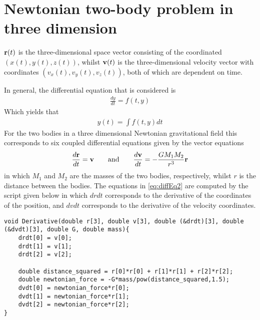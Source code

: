\section{Newtonian two-body problem in three dimension}
\label{Newton2body3D}
$\mbox{\textbf{r}}(t)$ is the three-dimensional space vector consisting of the coordinated $(x(t),y(t),z(t))$, whilst $\mbox{\textbf{v}}(t)$ is the three-dimensional velocity vector with coordinates $(v_x(t),v_y(t),v_z(t))$, both of which are dependent on time. 

In general, the differential equation that is considered is
\begin{align}
	\frac{dy}{dt} = f(t,y)
	\label{eq:diffEq1}
\end{align}
Which yields that
\begin{align}
	y(t) = \int f(t,y) dt
\end{align}
For the two bodies in a three dimensional Newtonian gravitational field this corresponds to six coupled differential equations given by the vector equations
\begin{align}
	\frac{d\mbox{\textbf{r}}}{dt} = \mbox{\textbf{v}}
	\qquad \text{and} \qquad
	\frac{d\mbox{\textbf{v}}}{dt} = - \frac{G M_1 M_2}{r^3} \mbox{\textbf{r}}
	\label{eq:diffEq2}
\end{align}
in which $M_1$ and $M_2$  are the masses of the two bodies, respectively, whilst $r$ is the distance between the bodies.
The equations in \eqref{eq:diffEq2} are computed by the script given below in which $drdt$ corresponds to the derivative of the coordinates of the position, and $dvdt$ corresponds to the derivative of the velocity coordinates. 
\begin{lstlisting}
void Derivative(double r[3], double v[3], double (&drdt)[3], double (&dvdt)[3], double G, double mass){
    drdt[0] = v[0];
    drdt[1] = v[1];
    drdt[2] = v[2];

    double distance_squared = r[0]*r[0] + r[1]*r[1] + r[2]*r[2];
    double newtonian_force = -G*mass/pow(distance_squared,1.5);
    dvdt[0] = newtonian_force*r[0];
    dvdt[1] = newtonian_force*r[1];
    dvdt[2] = newtonian_force*r[2];
}
\end{lstlisting}

